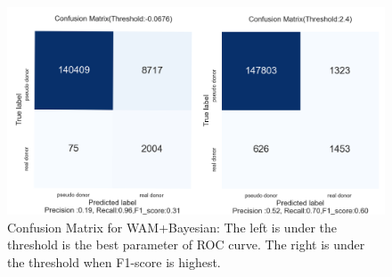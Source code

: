\documentclass{gapd}
\begin{document}
\begin{figure}[hb]
  \centering
  \includegraphics[width=\columnwidth]{assets/image-20210624154819817.png}
  \caption{Confusion Matrix for WAM+Bayesian: The left is under the
  threshold is the best parameter of ROC curve. The right is under the
  threshold when F1-score is highest.}
  \label{fig:WBmatrix}
\end{figure}
\end{document}

